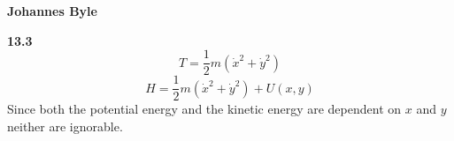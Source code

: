 \documentclass[english]{article}
\begin{document}
\begin{multicols*}{2}
\textbf{Johannes Byle}\\
\newcommand{\Lagr}{\mathcal{L}}

\noindent
\textbf{13.3}\\
$$T=\frac{1}{2}m(\dot{x}^2+\dot{y}^2)$$
$$H=\frac{1}{2}m(\dot{x}^2+\dot{y}^2)+U(x,y)$$
Since both the potential energy and the kinetic energy are dependent on $x$ and $y$ neither are ignorable.

\end{multicols*}
\end{document}
